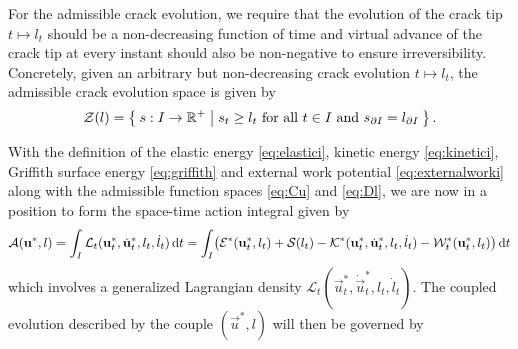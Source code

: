 For the admissible crack evolution, we require that the evolution of the crack tip $t\mapsto l_t$ should be a non-decreasing function of time and virtual advance of the crack tip at every instant should also be non-negative to ensure irreversibility. Concretely, given an arbitrary but non-decreasing crack evolution $t\mapsto l_t$, the admissible crack evolution space is given by
\begin{equation} \label{eq:Dl}
\mathcal{Z}(l)=\Set{s:I\to\mathbb{R}^+|s_t\geq l_t\text{ for all $t\in I$ and }s_{\partial I}=l_{\partial I}}.
\end{equation}

With the definition of the elastic energy \eqref{eq:elastici}, kinetic energy \eqref{eq:kinetici}, Griffith surface energy \eqref{eq:griffith} and external work potential \eqref{eq:externalworki} along with the admissible function spaces \eqref{eq:Cu} and \eqref{eq:Dl}, we are now in a position to form the space-time action integral given by
\begin{equation} \label{eq:action}
\mathcal{A}(\vec{u}^*,l)=\int_I\mathcal{L}_t(\vec{u}^*_t,\dot{\vec{u}}^*_t,l_t,\dot{l}_t)\D{t}=\int_I\bigl(\mathcal{E}^*(\vec{u}_t^*,l_t)+\mathcal{S}(l_t)-\mathcal{K}^*(\vec{u}_t^*,\dot{\vec{u}}_t^*,l_t,\dot{l}_t)-\mathcal{W}_t^*(\vec{u}_t^*,l_t)\bigr)\D{t}
\end{equation}
which involves a generalized Lagrangian density $\mathcal{L}_t(\vec{u}^*_t,\dot{\vec{u}}^*_t,l_t,\dot{l}_t)$. The coupled evolution described by the couple $(\vec{u}^*,l)$ will then be governed by

